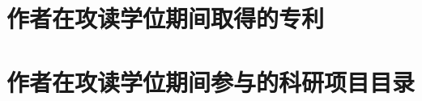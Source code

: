 
\section[\hspace{-2pt}作者在攻读学位期间取得的专利]{{ \hspace{-8pt}作者在攻读学位期间取得的专利}}

\section[\hspace{-2pt}作者在攻读学位期间参与的科研项目目录]{{ \hspace{-8pt}作者在攻读学位期间参与的科研项目目录}}

